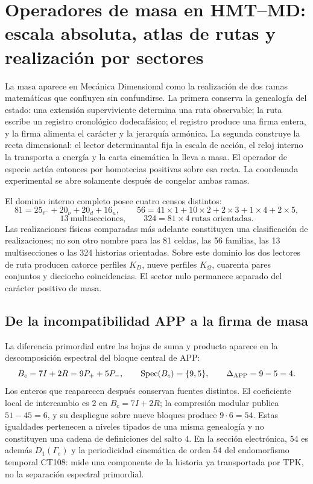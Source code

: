 \section{Operadores de masa en HMT--MD: escala absoluta, atlas de rutas y realización por sectores}
\label{sec:tabla-completa-masas-hmt-sm-revfinal}

La masa aparece en Mecánica Dimensional como la realización de dos ramas
matemáticas que confluyen sin confundirse. La primera conserva la genealogía del
estado: una extensión superviviente determina una ruta observable; la ruta escribe
un registro cronológico dodecafásico; el registro produce una firma entera, y la firma
alimenta el carácter y la jerarquía armónica. La segunda construye la recta
dimensional: el lector determinantal fija la escala de acción, el reloj interno la
transporta a energía y la carta cinemática la lleva a masa. El operador de especie
actúa entonces por homotecias positivas sobre esa recta. La coordenada experimental
se abre solamente después de congelar ambas ramas.

El dominio interno completo posee cuatro censos distintos:
\begin{equation}
 81=25_{\ell^-}+20_{\nu}+20_d+16_u,\qquad
 56=41\!\times\!1+10\!\times\!2+2\!\times\!3+1\!\times\!4+2\!\times\!5,
 \label{eq:censos-81-56-masas-rectoras}
\end{equation}
\begin{equation}
 13\ \text{multisecciones},\qquad
 324=81\times4\ \text{rutas orientadas}.
 \label{eq:censos-13-324-masas-rectoras}
\end{equation}
Las realizaciones físicas comparadas más adelante constituyen una
clasificación de realizaciones; no son otro nombre para las 81 celdas, las 56
familias, las 13 multisecciones o las 324 historias orientadas. Sobre este dominio
los dos lectores de ruta producen catorce perfiles \(K_D\), nueve perfiles
\(K_\Omega\), cuarenta pares conjuntos y dieciocho coincidencias. El sector nulo
permanece separado del carácter positivo de masa.

\subsection{De la incompatibilidad APP a la firma de masa}

La diferencia primordial entre las hojas de suma y producto aparece en la
descomposición espectral del bloque central de APP:
\begin{equation}
 B_c=7I+2R=9P_++5P_-,\qquad
 \operatorname{Spec}(B_c)=\{9,5\},\qquad
 \Delta_{\rm APP}=9-5=4.
 \label{eq:salto-app-cuatro-ley-masas}
\end{equation}
Los enteros que reaparecen después conservan fuentes distintos. El coeficiente
local de intercambio es \(2\) en \(B_c=7I+2R\); la compresión modular publica
\(51-45=6\), y su despliegue sobre nueve bloques produce \(9\cdot6=54\). Estas
igualdades pertenecen a niveles tipados de una misma genealogía y no constituyen
una cadena de definiciones del salto \(4\). En la sección electrónica, \(54\) es
además \(D_1(\Gamma_e)\) y la periodicidad cinemática de orden \(54\) del
endomorfismo temporal CT108: mide una componente de la historia ya transportada
por TPK, no la separación espectral primordial.

